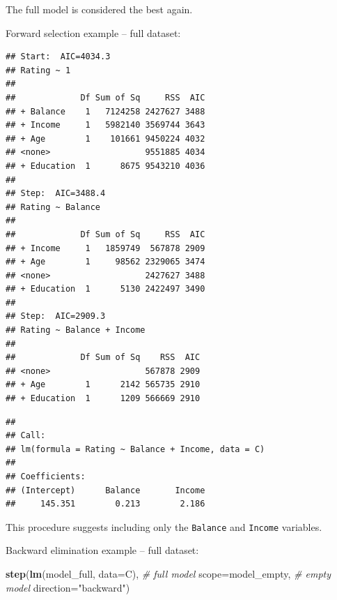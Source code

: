 \documentclass[10pt,b5paper,krantz1]{krantz}
\newenvironment{Shaded}{\begin{snugshade}}{\end{snugshade}}
\newcommand{\CommentTok}[1]{\textcolor[rgb]{0.37,0.37,0.37}{\textit{#1}}}
\newcommand{\DataTypeTok}[1]{\textcolor[rgb]{0.27,0.27,0.27}{#1}}
\newcommand{\KeywordTok}[1]{\textcolor[rgb]{0.27,0.27,0.27}{\textbf{#1}}}
\newcommand{\NormalTok}[1]{#1}
\newcommand{\StringTok}[1]{\textcolor[rgb]{0.5,0.5,0.5}{#1}}
\begin{document}
The full model is considered the best again.

\bigskip

Forward selection example -- full dataset:

\begin{Shaded}
\end{Shaded}

\begin{verbatim}
## Start:  AIC=4034.3
## Rating ~ 1
## 
##             Df Sum of Sq     RSS  AIC
## + Balance    1   7124258 2427627 3488
## + Income     1   5982140 3569744 3643
## + Age        1    101661 9450224 4032
## <none>                   9551885 4034
## + Education  1      8675 9543210 4036
## 
## Step:  AIC=3488.4
## Rating ~ Balance
## 
##             Df Sum of Sq     RSS  AIC
## + Income     1   1859749  567878 2909
## + Age        1     98562 2329065 3474
## <none>                   2427627 3488
## + Education  1      5130 2422497 3490
## 
## Step:  AIC=2909.3
## Rating ~ Balance + Income
## 
##             Df Sum of Sq    RSS  AIC
## <none>                   567878 2909
## + Age        1      2142 565735 2910
## + Education  1      1209 566669 2910
\end{verbatim}

\begin{verbatim}
## 
## Call:
## lm(formula = Rating ~ Balance + Income, data = C)
## 
## Coefficients:
## (Intercept)      Balance       Income  
##     145.351        0.213        2.186
\end{verbatim}

This procedure suggests including only the \texttt{Balance} and \texttt{Income}
variables.

\bigskip

Backward elimination example -- full dataset:

\begin{Shaded}
\begin{Highlighting}[]
\KeywordTok{step}\NormalTok{(}\KeywordTok{lm}\NormalTok{(model_full, }\DataTypeTok{data=}\NormalTok{C), }\CommentTok{# full model}
     \DataTypeTok{scope=}\NormalTok{model_empty, }\CommentTok{# empty model}
     \DataTypeTok{direction=}\StringTok{"backward"}\NormalTok{)}
\end{Highlighting}
\end{Shaded}
\end{document}
